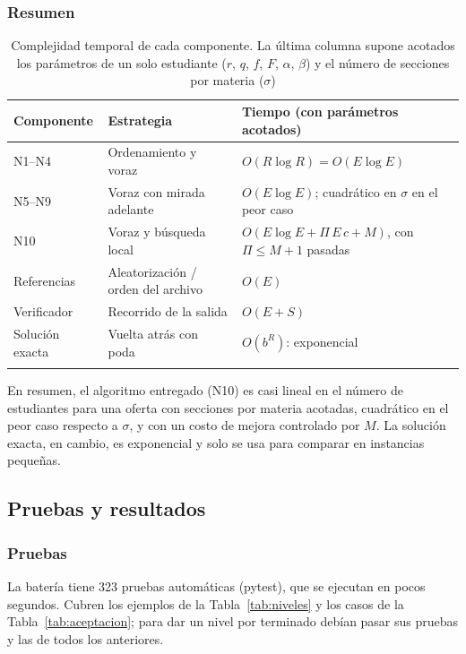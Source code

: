 \subsubsection{Resumen}

\begin{table}[htbp]
\caption{Complejidad temporal de cada componente. La última columna supone acotados los parámetros de un solo estudiante ($r$, $q$, $f$, $F$, $\alpha$, $\beta$) y el número de secciones por materia ($\sigma$)}\label{tab:resumen-complejidad}
\small
\begin{tabularx}{\textwidth}{@{}llL@{}}
\toprule
Componente & Estrategia & Tiempo (con parámetros acotados) \\
\midrule
N1--N4 & Ordenamiento y voraz & $O(R \log R) = O(E \log E)$ \\
N5--N9 & Voraz con mirada adelante & $O(E \log E)$; cuadrático en $\sigma$ en el peor caso \\
N10 & Voraz y búsqueda local & $O(E \log E + \Pi\,E\,c + M)$, con $\Pi \le M+1$ pasadas \\
Referencias & Aleatorización / orden del archivo & $O(E)$ \\
Verificador & Recorrido de la salida & $O(E + S)$ \\
Solución exacta & Vuelta atrás con poda & $O(b^R)$: exponencial \\
\botrule
\end{tabularx}
\end{table}

En resumen, el algoritmo entregado (N10) es casi lineal en el número de estudiantes para una oferta con secciones por materia acotadas, cuadrático en el peor caso respecto a $\sigma$, y con un costo de mejora controlado por $M$. La solución exacta, en cambio, es exponencial y solo se usa para comparar en instancias pequeñas.

\subsection{Pruebas y resultados}\label{sec:resultados}

\subsubsection{Pruebas}\label{sec:pruebas}

La batería tiene 323 pruebas automáticas (pytest), que se ejecutan en pocos segundos. Cubren los ejemplos de la Tabla~\ref{tab:niveles} y los casos de la Tabla~\ref{tab:aceptacion}; para dar un nivel por terminado debían pasar sus pruebas y las de todos los anteriores.

